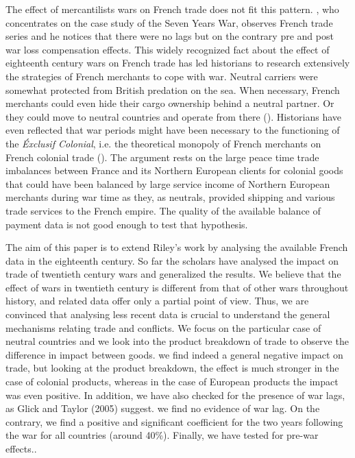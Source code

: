 \documentclass[12pt,a4paper,titlepage,english]{article}
\begin{document}
The effect of mercantilists wars on French trade does not fit this pattern. \cite{riley_seven_1986}, who concentrates on the case study of the Seven Years War, observes French trade series and he notices that there were no lags but on the contrary pre and post war loss compensation effects. This widely recognized fact about the effect of eighteenth century wars on French trade has led historians to research extensively the strategies of French merchants to cope with war. Neutral carriers were somewhat protected from British predation on the sea. When necessary, French merchants could even hide their cargo ownership behind a neutral partner. Or they could move to neutral countries and operate from there (\cite{marzagalli_was_2016}). Historians have even reflected that war periods might have been necessary to the functioning of the \textit{Éxclusif Colonial}, i.e. the theoretical monopoly of French merchants on French colonial trade (\cite{lespagnol_mondialisation_1997, morineau_vraie_1997, marzagalli_was_2016}). The argument rests on the large peace time trade imbalances between France and its Northern European clients for colonial goods that could have been balanced by large service income of Northern European merchants during war time as they, as neutrals, provided shipping and various trade services to the French empire. The quality of the available balance of payment data is not good enough to test that hypothesis.


The aim of this paper is to extend Riley’s work by analysing the available French data in the eighteenth century. So far the scholars have analysed the impact on trade of twentieth century wars and generalized the results. We believe that the effect of wars in twentieth century is different from that of other wars throughout history, and related data offer only a partial point of view. Thus, we are convinced that analysing less recent data is crucial to understand the general mechanisms relating trade and conflicts. We focus on the particular case of neutral countries and we look into the product breakdown of trade to observe the difference in impact between goods. we find indeed a general negative impact on trade, but looking at the product breakdown, the effect is much stronger in the case of colonial products, whereas in the case of European products the impact was even positive. In addition, we have also checked for the presence of war lags, as Glick and Taylor (2005) suggest. we find no evidence of war lag. On the contrary, we find a positive and significant coefficient for the two years following the war for all countries (around 40\%). Finally, we have tested for pre-war effects..  





\end{document}
